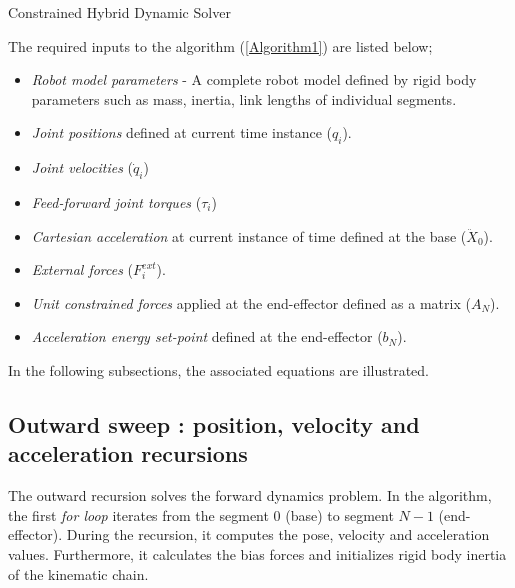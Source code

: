 \begin{algorithm}[h!]
{	 
}   

	\caption{Constrained Hybrid Dynamic Solver}
\end{algorithm}


The required inputs to the algorithm (\ref{Algorithm1}) are listed below;
\begin{itemize}
	\item \textit{Robot model parameters} - A complete robot model defined by rigid body parameters such as mass, inertia, link lengths of individual segments.
	\item \textit{Joint positions} defined at current time instance ($q_i$).
	\item \textit{Joint velocities} ($\dot{q}_i$)
	\item \textit{Feed-forward joint torques} ($\tau_i$)
	\item \textit{Cartesian acceleration} at current instance of time defined at the base ($\ddot{X}_0$).
	\item \textit{External forces} ($F^{ext}_i$).
	\item \textit{Unit constrained forces} applied at the end-effector defined as a matrix ($A_N$).
	\item \textit{Acceleration energy set-point} defined at the end-effector ($b_N$).
\end{itemize}

In the following subsections, the associated equations are illustrated.

\subsection{Outward sweep : position, velocity and acceleration recursions}
The outward recursion solves the forward dynamics problem. In the algorithm, the first \textit{for loop} iterates from the segment $0$ (base) to segment $N-1$ (end-effector). During the recursion, it computes the pose, velocity and acceleration values. Furthermore, it calculates the bias forces and initializes rigid body inertia of the kinematic chain. 

